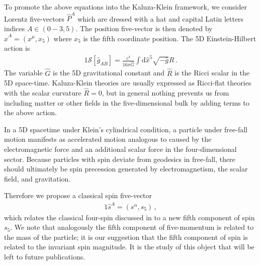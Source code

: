 To promote the above equations into the Kaluza-Klein framework, we consider Lorentz five-vectors $\hat{P}^{A}$ which are dressed with a hat and capital Latin letters indices $A\in(0-3,5)$. The position five-vector is then denoted by $\hat{x}^{A}=(x^{\mu},x_{5})$ where $x_{5}$ is the fifth coordinate position. The 5D Einstein-Hilbert action is
\begin{alignat}{1}
	\label{KALUZA01} \mathcal{S}[\hat{g}_{AB}]=\frac{c^{4}}{16\pi\hat{G}}\int\mathrm{d}\hat{x}^{5}\sqrt{-\hat{g}}\hat{R}\,.
\end{alignat}
The variable $\hat{G}$ is the 5D gravitational constant and $\hat{R}$ is the Ricci scalar in the 5D space-time. Kaluza-Klein theories are usually expressed as Ricci-flat theories with the scalar curvature $\hat{R}=0$, but in general nothing prevents us from including matter or other fields in the five-dimensional bulk by adding terms to the above action.

In a 5D spacetime under Klein's cylindrical condition, a particle under free-fall motion manifests as accelerated motion analogous to  caused by the electromagnetic force and an additional scalar force in the four-dimensional sector. Because particles with spin deviate from geodesics in free-fall, there should ultimately be spin precession generated by electromagnetism, the scalar field, and gravitation.

Therefore we propose a classical spin five-vector
\begin{alignat}{1}
	\label{KALUZA01a} \hat{s}^{A}=(s^{\alpha},s_{5})\,,
\end{alignat}
which relates the classical four-spin  discussed in  to a new fifth component of spin $s_{5}$. We note that analogously the fifth component of five-momentum is related to the mass of the particle; it is our suggestion that the fifth component of spin is related to the invariant spin magnitude. It is the study of this object that will be left to future publications.